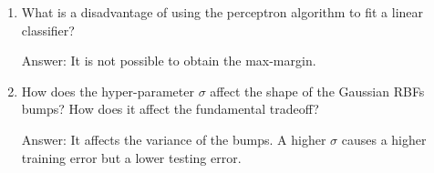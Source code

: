 \documentclass{article}
\newenvironment{answer}{\par\begingroup\color{gre}Answer: }{\endgroup}
\begin{document}
\begin{enumerate}
\item What is a disadvantage of using the perceptron algorithm to fit a linear classifier?
\begin{answer}
    It is not possible to obtain the max-margin.
\end{answer}
\item How does the hyper-parameter $\sigma$ affect the shape of the Gaussian RBFs bumps? How does it affect the fundamental tradeoff?
\begin{answer}
    It affects the variance of the bumps. A higher $\sigma$ causes a higher training error but a lower testing error.
\end{answer}
\end{enumerate}
\end{document}
